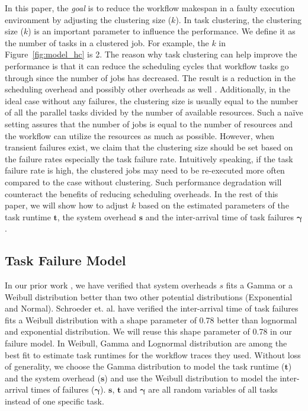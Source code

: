 \documentclass{IOS-Book-Article}
\begin{document}
In this paper, the \emph{goal} is to reduce the workflow makespan in a faulty execution environment by adjusting the clustering size ($k$). In task clustering, the clustering size ($k$) is an important parameter to influence the performance. We define it as the number of tasks in a clustered job. For example, the $k$ in Figure~\ref{fig:model_hc} is 2. The reason why task clustering can help improve the performance is that it can reduce the scheduling cycles that workflow tasks go through since the number of jobs has decreased. The result is a reduction in the scheduling overhead and possibly other overheads as well \cite{Chen2011}. Additionally, in the ideal case without any failures, the clustering size is usually equal to the number of all the parallel tasks divided by the number of available resources. Such a na\"{i}ve setting assures that the number of jobs is equal to the number of resources and the workflow can utilize the resources as much as possible. However, when transient failures exist, we claim that the clustering size should be set based on the failure rates especially the task failure rate. Intuitively speaking, if the task failure rate is high, the clustered jobs may need to be re-executed more often compared to the case without clustering. Such performance degradation will counteract the benefits of reducing scheduling overheads. In the rest of this paper, we will show how to adjust $k$ based on the estimated parameters of the task runtime $\bm t$, the system overhead $\bm s$ and the inter-arrival time of task failures $\bm\gamma$. 

\subsection{Task Failure Model}




In our prior work \cite{Chen2011}, we have verified that system overheads $s$ fits a Gamma or a Weibull distribution better than two other potential distributions (Exponential and Normal). Schroeder et. al. \cite{Schroeder2006} have verified the inter-arrival time of task failures fits a Weibull distribution with a shape parameter of 0.78 better than lognormal and exponential distribution. We will reuse this shape parameter of 0.78 in our failure model. 
In \cite{Sun2003, Iosup2008} Weibull, Gamma and Lognormal distribution are among the best fit to estimate task runtimes for the workflow traces they used.  Without loss of generality, we choose the Gamma distribution to model the task runtime ($\bm t$) and the system overhead ($\bm s$) and use the Weibull distribution to model the inter-arrival times of failures ($\bm\gamma$).  $\bm s$, $\bm t$ and $\bm \gamma$ are all random variables of all tasks instead of one specific task. 
\end{document}
